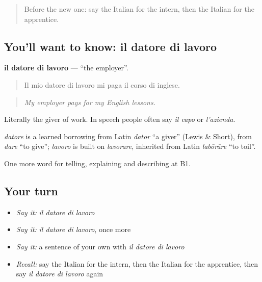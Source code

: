 \begin{quote}
Before the new one: say the Italian for the intern, then the Italian for the apprentice.
\end{quote}

\subsection*{You'll want to know: il datore di lavoro}
\textbf{il datore di lavoro} — \textquotedblleft{}the employer\textquotedblright{}.

\begin{quote}
Il mio datore di lavoro mi paga il corso di inglese.
\end{quote}

\begin{quote}
\emph{My employer pays for my English lessons.}
\end{quote}

Literally the giver of work. In speech people often say \emph{il capo} or \emph{l'azienda}.

\begin{cousinweb}
\emph{datore} is a learned borrowing from Latin \emph{dator} \textquotedblleft{}a giver\textquotedblright{} (Lewis \& Short), from \emph{dare} \textquotedblleft{}to give\textquotedblright{}; \emph{lavoro} is built on \emph{lavorare}, inherited from Latin \emph{labōrāre} \textquotedblleft{}to toil\textquotedblright{}.
\end{cousinweb}

\begin{grammarlens}[title={What you've built}]
One more word for telling, explaining and describing at B1.
\end{grammarlens}

\subsection*{Your turn}
\begin{itemize}
\raggedright
  \item \emph{Say it:} \emph{il datore di lavoro}
  \item \emph{Say it:} \emph{il datore di lavoro}, once more
  \item \emph{Say it:} a sentence of your own with \emph{il datore di lavoro}
  \item \emph{Recall:} say the Italian for the intern, then the Italian for the apprentice, then say \emph{il datore di lavoro} again
\end{itemize}

